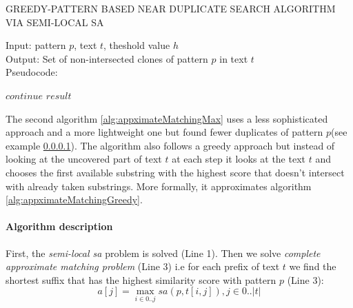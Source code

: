\begin{algorithm}[H]
\caption{GREEDY-PATTERN BASED NEAR DUPLICATE
SEARCH ALGORITHM VIA SEMI-LOCAL SA}
\label{alg:appximateMatchingGreedy}
Input: pattern $p$, text $t$, theshold value $h$\\
Output: Set of non-intersected clones of pattern $p$ in text $t$\\
Pseudocode:
\begin{algorithmic}[1]
   	\ENDIF
   	\ENDIF
   	
   \ELSE 
   \STATE $continue$ 
   \ENDIF
\ENDWHILE
\RETURN $result$

\end{algorithmic}
\end{algorithm}


The second algorithm \ref{alg:appximateMatchingMax} uses a less sophisticated approach and a more lightweight one but found fewer duplicates of pattern $p$(see example \ref{}).
The algorithm also follows a greedy approach but instead of looking at the uncovered part of text $t$ at each step it looks at the text $t$ and chooses the first available substring with the highest score that doesn't intersect with already taken substrings.
More formally, it approximates algorithm \ref{alg:appximateMatchingGreedy}.

\paragraph{Algorithm description}
First, the \emph{semi-local sa} problem is solved (Line 1).
Then we solve \emph{complete approximate matching problem} (Line 3) i.e
for each prefix of text $t$ we find the shortest suffix that has the highest similarity score with pattern $p$ (Line 3):
\begin{equation}
    a[j] = \max _{i \in 0 ..j} sa(p,t[i,j]), j \in 0..|t|
\end{equation}

